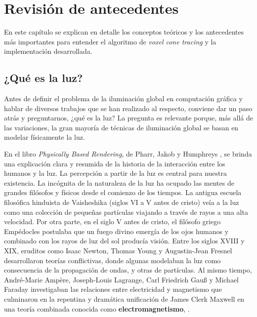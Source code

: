 \graphicspath{{chapters/2_antecedentes/figures/}}

\chapter{Revisión de antecedentes}


En este capítulo se explican en detalle los conceptos teóricos y los antecedentes más importantes para entender el algoritmo de \textit{voxel cone tracing} y la implementación desarrollada.

\section{¿Qué es la luz?}

Antes de definir el problema de la iluminación global en computación gráfica y hablar de diversos trabajos que se han realizado al respecto, conviene dar un paso atrás y preguntarnos, ¿qué es la luz?
La pregunta es relevante porque, más allá de las variaciones, la gran mayoría de técnicas de iluminación global se basan en modelar físicamente la luz.

En el libro \textit{Physically Based Rendering}, de Pharr, Jakob y Humphreys \cite{pbr}, se brinda una explicación clara y resumida de la historia de la interacción entre los humanos y la luz.
La percepción a partir de la luz es central para nuestra existencia.
La incógnita de la naturaleza de la luz ha ocupado las mentes de grandes filósofos y físicos desde el comienzo de los tiempos.
La antigua escuela filosófica hinduista de Vaisheshika (siglos VI a V antes de cristo) veía a la luz como una colección de pequeñas partículas viajando a través de rayos a una alta velocidad.
Por otra parte, en el siglo V antes de cristo, el filósofo griego Empédocles postulaba que un fuego divino emergía de los ojos humanos y combinado con los rayos de luz del sol producía visión.
Entre los siglos XVIII y XIX, eruditos como Isaac Newton, Thomas Young y Augustin-Jean Fresnel desarrollaron teorías conflictivas, donde algunas modelaban la luz como consecuencia de la propagación de ondas, y otras de partículas.
Al mismo tiempo, André-Marie Ampère, Joseph-Louis Lagrange, Carl Friedrich Gauß y Michael Faraday investigaban las relaciones entre electricidad y magnetismo que culminaron en la repentina y dramática unificación de James Clerk Maxwell en una teoría combinada conocida como \textbf{electromagnetismo}, \cite{maxwell-equations}.

